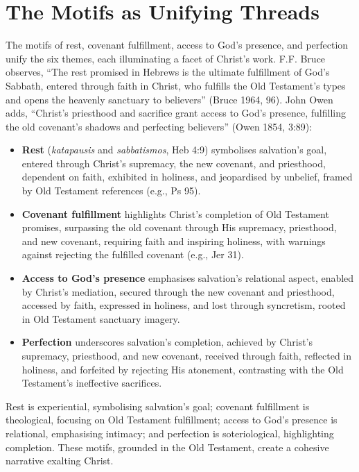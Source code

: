 \documentclass[12pt]{article}
\begin{document}
\section{The Motifs as Unifying Threads}
The motifs of rest, covenant fulfillment, access to God’s presence, and
perfection unify the six themes, each illuminating a facet of Christ’s work.
F.F. Bruce observes, ``The rest promised in Hebrews is the ultimate fulfillment
of God’s Sabbath, entered through faith in Christ, who fulfills the Old
Testament’s types and opens the heavenly sanctuary to believers'' (Bruce 1964,
96). John Owen adds, ``Christ’s priesthood and sacrifice grant access to God’s
presence, fulfilling the old covenant’s shadows and perfecting believers''
(Owen 1854, 3:89):
\begin{itemize}
    \item \textbf{Rest} (\textit{katapausis} and \textit{sabbatismos}, Heb 4:9)
    symbolises salvation’s goal, entered through Christ’s supremacy, the new
    covenant, and priesthood, dependent on faith, exhibited in holiness, and
    jeopardised by unbelief, framed by Old Testament references (e.g., Ps 95).
    \item \textbf{Covenant fulfillment} highlights Christ’s completion of Old
    Testament promises, surpassing the old covenant through His supremacy,
    priesthood, and new covenant, requiring faith and inspiring holiness, with
    warnings against rejecting the fulfilled covenant (e.g., Jer 31).
    \item \textbf{Access to God’s presence} emphasises salvation’s relational
    aspect, enabled by Christ’s mediation, secured through the new covenant and
    priesthood, accessed by faith, expressed in holiness, and lost through
    syncretism, rooted in Old Testament sanctuary imagery.
    \item \textbf{Perfection} underscores salvation’s completion, achieved by
    Christ’s supremacy, priesthood, and new covenant, received through faith,
    reflected in holiness, and forfeited by rejecting His atonement, contrasting
    with the Old Testament’s ineffective sacrifices.
\end{itemize}
Rest is experiential, symbolising salvation’s goal; covenant fulfillment is
theological, focusing on Old Testament fulfillment; access to God’s presence is
relational, emphasising intimacy; and perfection is soteriological,
highlighting completion. These motifs, grounded in the Old Testament, create a
cohesive narrative exalting Christ.
\end{document}
